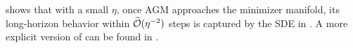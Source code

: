 shows that with a small $\eta$, once AGM approaches the minimizer manifold, its long-horizon behavior within $\widetilde{\mathcal{O}}(\eta^{-2})$ steps is captured by the SDE in . A more explicit version of  can be found in .


